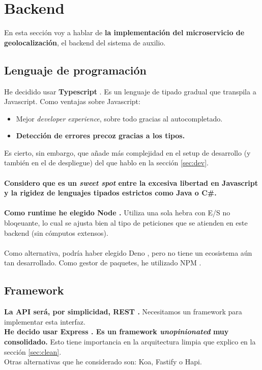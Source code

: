 \chapter{Backend}

En esta sección voy a hablar de \textbf{la implementación del microservicio de geolocalización}, el backend del sistema de auxilio.
\section{Lenguaje de programación}
He decidido usar \textbf{Typescript} \cite{typescript}. Es un lenguaje de tipado gradual que transpila a Javascript.
Como ventajas sobre Javascript:
\begin{itemize}
	\item Mejor \textit{developer experience}, sobre todo gracias al autocompletado.
	\item \textbf{Detección de errores precoz gracias a los tipos.}
\end{itemize}
Es cierto, sin embargo, que añade más complejidad en el setup de desarrollo (y también en el de despliegue) del que hablo en la sección \ref{sec:dev}. \\ \\
\textbf{Considero que es un \textit{sweet spot} entre la excesiva libertad en Javascript y la rigidez de lenguajes tipados estrictos como Java o C\#.} \\ \\

\textbf{Como runtime he elegido Node \cite{nodejs}.} Utiliza una sola hebra con E/S no bloqeuante, lo cual se ajusta bien al tipo 
de peticiones que se atienden en este backend (sin cómputos extensos).  \\ \\
Como alternativa, podría haber elegido Deno \cite{deno}, pero no tiene un ecosistema aún tan desarrollado.
Como gestor de paquetes, he utilizado NPM \cite{npm}.

\section{Framework}
\textbf{La API será, por simplicidad, REST \cite{rest}.} Necesitamos un framework para implementar esta interfaz. \\

\textbf{He decido usar Express \cite{express}. Es un framework \textit{unopinionated} muy consolidado.} Esto tiene importancia en la 
arquitectura limpia que explico en la sección \ref{sec:clean}. \\
Otras alternativas que he considerado son: Koa, Fastify o Hapi.

